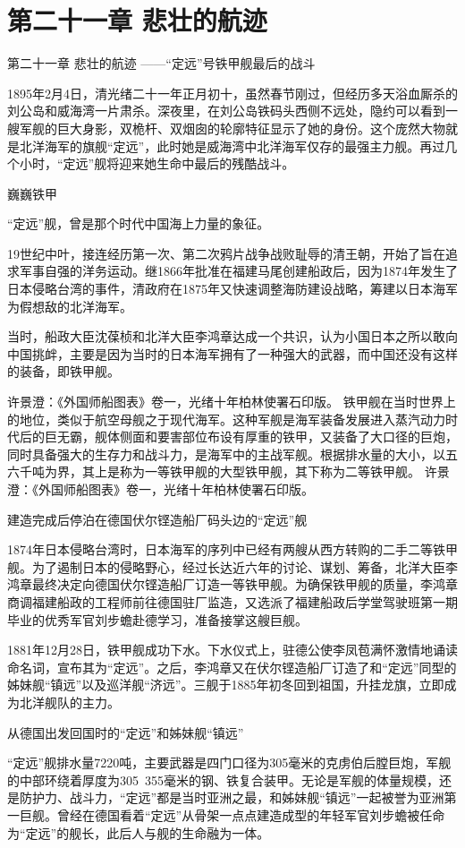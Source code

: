 \documentclass[12pt,UTF8]{ctexbook}
\begin{document}
\chapter{第二十一章 悲壮的航迹}

第二十一章
悲壮的航迹
——“定远”号铁甲舰最后的战斗

1895年2月4日，清光绪二十一年正月初十，虽然春节刚过，但经历多天浴血厮杀的刘公岛和威海湾一片肃杀。深夜里，在刘公岛铁码头西侧不远处，隐约可以看到一艘军舰的巨大身影，双桅杆、双烟囱的轮廓特征显示了她的身份。这个庞然大物就是北洋海军的旗舰“定远”，此时她是威海湾中北洋海军仅存的最强主力舰。再过几个小时，“定远”舰将迎来她生命中最后的残酷战斗。

巍巍铁甲

“定远”舰，曾是那个时代中国海上力量的象征。

19世纪中叶，接连经历第一次、第二次鸦片战争战败耻辱的清王朝，开始了旨在追求军事自强的洋务运动。继1866年批准在福建马尾创建船政后，因为1874年发生了日本侵略台湾的事件，清政府在1875年又快速调整海防建设战略，筹建以日本海军为假想敌的北洋海军。

当时，船政大臣沈葆桢和北洋大臣李鸿章达成一个共识，认为小国日本之所以敢向中国挑衅，主要是因为当时的日本海军拥有了一种强大的武器，而中国还没有这样的装备，即铁甲舰。

许景澄：《外国师船图表》卷一，光绪十年柏林使署石印版。
铁甲舰在当时世界上的地位，类似于航空母舰之于现代海军。这种军舰是海军装备发展进入蒸汽动力时代后的巨无霸，舰体侧面和要害部位布设有厚重的铁甲，又装备了大口径的巨炮，同时具备强大的生存力和战斗力，是海军中的主战军舰。根据排水量的大小，以五六千吨为界，其上是称为一等铁甲舰的大型铁甲舰，其下称为二等铁甲舰。 许景澄：《外国师船图表》卷一，光绪十年柏林使署石印版。


建造完成后停泊在德国伏尔铿造船厂码头边的“定远”舰

1874年日本侵略台湾时，日本海军的序列中已经有两艘从西方转购的二手二等铁甲舰。为了遏制日本的侵略野心，经过长达近六年的讨论、谋划、筹备，北洋大臣李鸿章最终决定向德国伏尔铿造船厂订造一等铁甲舰。为确保铁甲舰的质量，李鸿章商调福建船政的工程师前往德国驻厂监造，又选派了福建船政后学堂驾驶班第一期毕业的优秀军官刘步蟾赴德学习，准备接掌这艘巨舰。

1881年12月28日，铁甲舰成功下水。下水仪式上，驻德公使李凤苞满怀激情地诵读命名词，宣布其为“定远”。之后，李鸿章又在伏尔铿造船厂订造了和“定远”同型的姊妹舰“镇远”以及巡洋舰“济远”。三舰于1885年初冬回到祖国，升挂龙旗，立即成为北洋舰队的主力。


从德国出发回国时的“定远”和姊妹舰“镇远”

“定远”舰排水量7220吨，主要武器是四门口径为305毫米的克虏伯后膛巨炮，军舰的中部环绕着厚度为305~355毫米的钢、铁复合装甲。无论是军舰的体量规模，还是防护力、战斗力，“定远”都是当时亚洲之最，和姊妹舰“镇远”一起被誉为亚洲第一巨舰。曾经在德国看着“定远”从骨架一点点建造成型的年轻军官刘步蟾被任命为“定远”的舰长，此后人与舰的生命融为一体。
\end{document}
